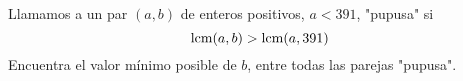 Llamamos a un par $(a,b)$ de enteros positivos, $a<391$, "pupusa" si
\[\textup{lcm}(a,b)>\textup{lcm}(a,391) \]
Encuentra el valor mínimo posible de $b$, entre todas las parejas "pupusa".
